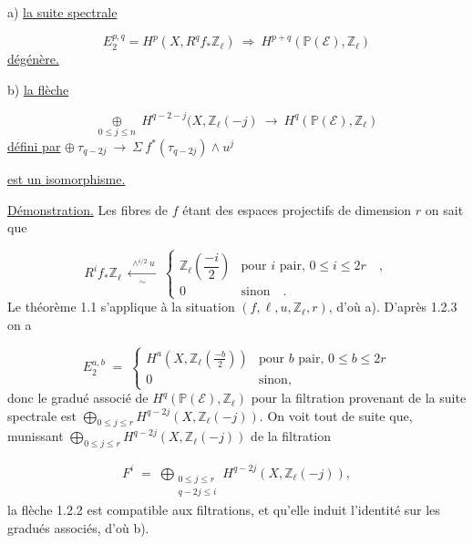 a) \underline{la suite spectrale}

\begin{equation}\tag{1.2.1}
E_2^{p,q} = H^p(X,R^q f_* \mathbb{Z}_\ell) \ \Longrightarrow\ H^{p+q}(\mathbb{P}(\mathcal{E}), \mathbb{Z}_\ell)
\end{equation}
\underline{dégénère.}

b) \underline{la flèche}

\begin{equation}\tag{1.2.2}
\underset{0 \leq j \leq n}{\oplus} \ H^{q-2-j}(X,\mathbb{Z}_\ell(-j) \ \longrightarrow\ H^q(\mathbb{P}(\mathcal{E}),\mathbb{Z}_\ell)
\end{equation}
\underline{défini par} $\oplus\ \tau_{q-2j} \ \longrightarrow\ \Sigma\ f^*(\tau_{q-2j}) \wedge u^j$

\underline{est un isomorphisme.}

\underline{Démonstration.} Les fibres de $f$ étant des espaces projectifs de dimension $r$ on sait que

\begin{equation}\tag{1.2.3}
R^i f_* \mathbb{Z}_\ell \ \xleftarrow[\ \sim\ ]{\ \wedge^{i/2} u\ } \ \begin{cases} \mathbb{Z}_\ell \left( \dfrac{-i}{2} \right) & \text{pour } i \text{ pair, } 0 \leq i \leq 2r \quad , \\[2ex] 0 & \text{sinon} \quad . \end{cases}
\end{equation}
Le théorème 1.1 s'applique à la situation $(f, \ell, u, \mathbb{Z}_\ell, r)$, d'où a). D'après 1.2.3  on a 



\begin{equation}\tag{1.2.4}
 E_2^{a,b} \;=\; \begin{cases} H^a(X,\mathbb{Z}_{\ell}(\frac{-b}{2})) & \text{pour } b \text{ pair, } 0 \leq b \leq 2r \\[2ex] 0 & \text{sinon,} \end{cases}
\end{equation}
donc le gradué associé de $H^q(\mathbb{P}(\mathcal{E}), \mathbb{Z}_{\ell})$ pour la filtration provenant de la suite spectrale est $\bigoplus\limits_{0 \leq j \leq r} H^{q-2j}(X,\mathbb{Z}_{\ell}(-j))$. On voit tout de suite que, munissant $\bigoplus\limits_{0 \leq j \leq r} H^{q-2j}(X,\mathbb{Z}_{\ell}(-j))$ de la filtration

\begin{multline*}
F^i \;=\; \bigoplus_{\substack{0 \leq j \leq r \\ q-2j \leq i}} H^{q-2j}(X,\mathbb{Z}_{\ell}(-j)),
\end{multline*}
la flèche 1.2.2 est compatible aux filtrations, et qu'elle induit l'identité sur les gradués associés, d'où b).


